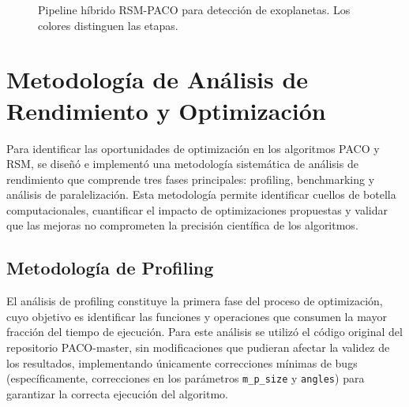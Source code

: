 \begin{figure}[H]
\caption{Pipeline híbrido RSM-PACO para detección de exoplanetas. Los colores distinguen las etapas.}
\label{fig:diagrama-solucion}
\end{figure}



\section{Metodología de Análisis de Rendimiento y Optimización}

Para identificar las oportunidades de optimización en los algoritmos PACO y RSM, se diseñó e implementó una metodología sistemática de análisis de rendimiento que comprende tres fases principales: profiling, benchmarking y análisis de paralelización. Esta metodología permite identificar cuellos de botella computacionales, cuantificar el impacto de optimizaciones propuestas y validar que las mejoras no comprometen la precisión científica de los algoritmos.

\subsection{Metodología de Profiling}

El análisis de profiling constituye la primera fase del proceso de optimización, cuyo objetivo es identificar las funciones y operaciones que consumen la mayor fracción del tiempo de ejecución. Para este análisis se utilizó el código original del repositorio PACO-master, sin modificaciones que pudieran afectar la validez de los resultados, implementando únicamente correcciones mínimas de bugs (específicamente, correcciones en los parámetros \texttt{m\_p\_size} y \texttt{angles}) para garantizar la correcta ejecución del algoritmo.


